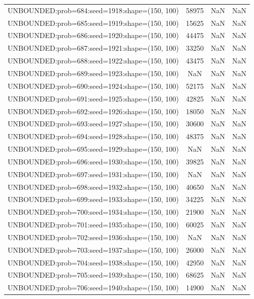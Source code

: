 \begin{longtable}{lccc}
UNBOUNDED:prob=684:seed=1918:shape=(150, 100) & 58975 &   NaN &    NaN \\
UNBOUNDED:prob=685:seed=1919:shape=(150, 100) & 15625 &   NaN &    NaN \\
UNBOUNDED:prob=686:seed=1920:shape=(150, 100) & 44475 &   NaN &    NaN \\
UNBOUNDED:prob=687:seed=1921:shape=(150, 100) & 33250 &   NaN &    NaN \\
UNBOUNDED:prob=688:seed=1922:shape=(150, 100) & 43475 &   NaN &    NaN \\
UNBOUNDED:prob=689:seed=1923:shape=(150, 100) &   NaN &   NaN &    NaN \\
UNBOUNDED:prob=690:seed=1924:shape=(150, 100) & 52175 &   NaN &    NaN \\
UNBOUNDED:prob=691:seed=1925:shape=(150, 100) & 42825 &   NaN &    NaN \\
UNBOUNDED:prob=692:seed=1926:shape=(150, 100) & 18050 &   NaN &    NaN \\
UNBOUNDED:prob=693:seed=1927:shape=(150, 100) & 30600 &   NaN &    NaN \\
UNBOUNDED:prob=694:seed=1928:shape=(150, 100) & 48375 &   NaN &    NaN \\
UNBOUNDED:prob=695:seed=1929:shape=(150, 100) &   NaN &   NaN &    NaN \\
UNBOUNDED:prob=696:seed=1930:shape=(150, 100) & 39825 &   NaN &    NaN \\
UNBOUNDED:prob=697:seed=1931:shape=(150, 100) &   NaN &   NaN &    NaN \\
UNBOUNDED:prob=698:seed=1932:shape=(150, 100) & 40650 &   NaN &    NaN \\
UNBOUNDED:prob=699:seed=1933:shape=(150, 100) & 34225 &   NaN &    NaN \\
UNBOUNDED:prob=700:seed=1934:shape=(150, 100) & 21900 &   NaN &    NaN \\
UNBOUNDED:prob=701:seed=1935:shape=(150, 100) & 60025 &   NaN &    NaN \\
UNBOUNDED:prob=702:seed=1936:shape=(150, 100) &   NaN &   NaN &    NaN \\
UNBOUNDED:prob=703:seed=1937:shape=(150, 100) & 26000 &   NaN &    NaN \\
UNBOUNDED:prob=704:seed=1938:shape=(150, 100) & 42950 &   NaN &    NaN \\
UNBOUNDED:prob=705:seed=1939:shape=(150, 100) & 68625 &   NaN &    NaN \\
UNBOUNDED:prob=706:seed=1940:shape=(150, 100) & 14900 &   NaN &    NaN \\

\end{longtable}
